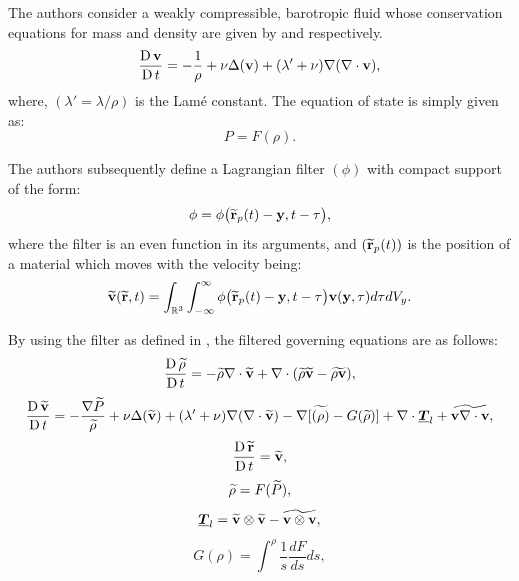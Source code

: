 The authors consider a weakly compressible, barotropic fluid whose conservation equations for mass and density are given by  and  respectively.
\begin{equation}
    \frac{\operatorname{D} \mathbf{v}}{\operatorname{D} t} = -\frac{1}{\rho} + \nu \Delta(\mathbf{v}) + (\lambda' + \nu)\nabla(\nabla \cdot \mathbf{v}),
    \label{eq:DiMascio2017-mom-governing}
\end{equation}
where, $(\lambda' = \lambda/\rho)$ is the Lam\'e constant.
The equation of state is simply given as:
\begin{equation}
    P = F(\rho).
    \label{eq:DiMascio2017-eos}
\end{equation}

The authors subsequently define a Lagrangian filter $(\phi)$ with compact support of the form:
\begin{equation}
    \phi = \phi\big(\widetilde{\mathbf{r}}_p(t)-\mathbf{y}, t-\tau  \big),
    \label{eq:DiMascio2017-filter}
\end{equation}
where the filter is an even function in its arguments, and $(\widetilde{\mathbf{r}}_p(t))$ is the position of a material which moves with the velocity being:
\begin{equation}
    \widetilde{\mathbf{v}}(\widetilde{\mathbf{r}}, t) = \int_{\mathbb{R}^3} \int_{-\infty}^{\infty} \phi \big(\widetilde{\mathbf{r}}_p(t)-\mathbf{y}, t-\tau  \big) \mathbf{v}(\mathbf{y}, \tau)d\tau dV_y.
\end{equation}

By using the filter as defined in , the filtered governing equations are as follows:
\begin{equation}
    \frac{\operatorname{D} \widetilde{\rho}}{\operatorname{D} t} = -\widetilde{\rho} \nabla \cdot \widetilde{\mathbf{v}} + \nabla \cdot (\widetilde{\rho}\widetilde{\mathbf{v}} - \widetilde{\rho \mathbf{v}}),
\end{equation}
\begin{equation}
    \frac{\operatorname{D} \widetilde{\mathbf{v}}}{\operatorname{D} t} = - \frac{\nabla \widetilde{P}}{\widetilde{\rho}} + \nu \Delta(\widetilde{\mathbf{v}}) + (\lambda'+\nu)\nabla(\nabla\cdot\widetilde{\mathbf{v}}) - \nabla[\widetilde{(\rho)}-G(\widetilde{\rho})] + \nabla\cdot\underline{\bm{T}}_l+\widetilde{\mathbf{v}\nabla\cdot\mathbf{v}},
\end{equation}
\begin{equation}
    \frac{\operatorname{D} \widetilde{\mathbf{r}}}{\operatorname{D} t}=\widetilde{\mathbf{v}},
\end{equation}
\begin{equation}
    \widetilde{\rho} = F(\widetilde{P}),
\end{equation}
\begin{equation}
    \underline{\bm{T}}_l = \widetilde{\mathbf{v}}\otimes\widetilde{\mathbf{v}} - \widetilde{\mathbf{v}\otimes\mathbf{v}},
\end{equation}
\begin{equation}
    G(\rho) = \int^{\rho} \frac{1}{s}\frac{dF}{ds}ds,
\end{equation}

